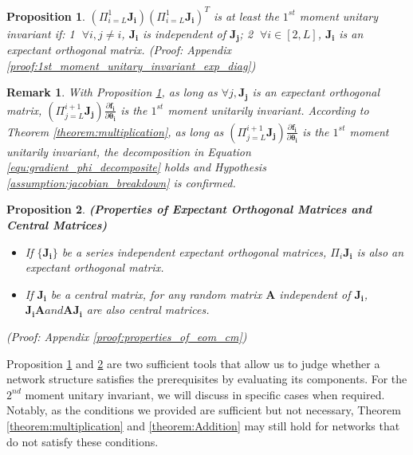\documentclass[10pt,journal,compsoc]{IEEEtran}
\newcommand{\modify}[1]{{ #1}}
\newtheorem{corollary}{Remark}[section]
\newtheorem{prop}{Proposition}[section]
\begin{document}
\begin{prop}
$(\Pi_{i=L}^1 \mathbf{J_i})(\Pi_{i=L}^1 \mathbf{J_i})^T$ is at least the $1^{st}$ moment unitary invariant if: \textcircled{1} $\forall i,j\neq i$, $\mathbf{J_i}$ is independent of $\mathbf{J_j}$; \textcircled{2} $\forall i \in [2, L]$, $\mathbf{J_i}$ is an expectant orthogonal matrix. (Proof: Appendix \ref{proof:1st_moment_unitary_invariant_exp_diag})
\label{prop:1st_moment_unitary_invariant_exp_diag}
\end{prop}
\modify{
\begin{corollary}
With Proposition \ref{prop:1st_moment_unitary_invariant_exp_diag}, as long as $\forall j, \mathbf{J_j}$ is an expectant orthogonal matrix, $(\Pi_{j=L}^{i+1}\mathbf{J_j})\frac{\partial \mathbf{f_{i}}}{\partial \mathbf{\theta_{i}}}$ is the $1^{st}$ moment unitarily invariant. According to Theorem \ref{theorem:multiplication}, as long as $(\Pi_{j=L}^{i+1}\mathbf{J_j})\frac{\partial \mathbf{f_{i}}}{\partial \mathbf{\theta_{i}}}$ is the $1^{st}$ moment unitarily invariant, the decomposition in Equation \eqref{equ:gradient_phi_decomposite} holds and Hypothesis \ref{assumption:jacobian_breakdown} is confirmed.
\label{remark:hyp31}
\end{corollary}
}
\begin{prop}
\textbf{(Properties of Expectant Orthogonal Matrices and Central Matrices)}
\begin{itemize}
\item If $\{\mathbf{J_i}\}$ be a series independent expectant orthogonal matrices, $\Pi_i\mathbf{J_i}$ is also an expectant orthogonal matrix.
    \item If $\mathbf{J_i}$ be a central matrix, for any random matrix $\mathbf{A}$ independent of $\mathbf{J_i}$, $\mathbf{J_iA} and \mathbf{AJ_i}$ are also central matrices.
\end{itemize}
(Proof: Appendix \ref{proof:properties_of_eom_cm})
\label{prop:properties_of_eom_cm}
\end{prop}

Proposition \ref{prop:1st_moment_unitary_invariant_exp_diag} and \ref{prop:properties_of_eom_cm} are two sufficient tools that allow us to judge whether a network structure satisfies the prerequisites by evaluating its components. For the $2^{nd}$ moment unitary invariant, we will discuss in specific cases when required. Notably, as the conditions we provided are sufficient but not necessary, Theorem \ref{theorem:multiplication} and \ref{theorem:Addition} may still hold for networks that do not satisfy these conditions.
\end{document}

